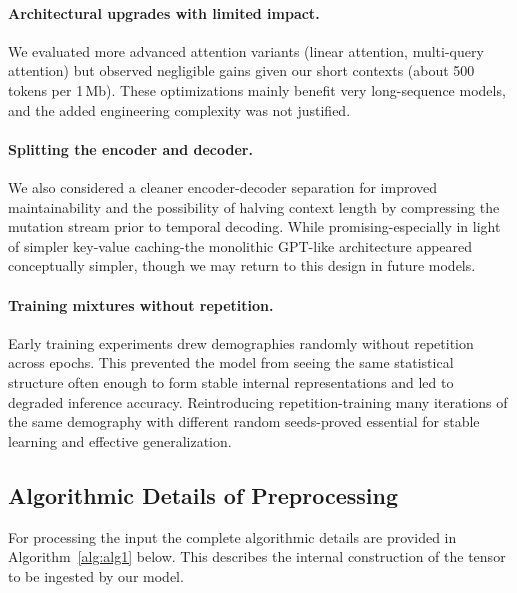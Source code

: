 \documentclass[9pt,twoside]{pnas-new} %
\providecommand{\DIFadd}[1]{{\protect\color{blue}\uwave{#1}}} %
\providecommand{\DIFaddbegin}{} %
\providecommand{\DIFaddend}{} %
\begin{document}
\paragraph{Architectural upgrades with limited impact.}
We evaluated more advanced attention variants (linear
attention, multi-query attention) but observed negligible gains given our short
contexts (about 500 tokens per 1\,Mb). These optimizations mainly benefit
very long-sequence models, and the added engineering complexity was not
justified.

\paragraph{Splitting the encoder and decoder.}
We also considered a cleaner encoder-decoder separation for improved
maintainability and the possibility of halving context length by compressing
the mutation stream prior to temporal decoding. While promising-\DIFaddbegin \DIFadd{--}\DIFaddend especially in
light of simpler key-value caching-\DIFaddbegin \DIFadd{--}\DIFaddend the monolithic GPT-like architecture appeared conceptually simpler, though we may return to this design in future models.

\paragraph{Training mixtures without repetition.}
Early training experiments drew demographies randomly without repetition across
epochs. This prevented the model from seeing the same statistical structure
often enough to form stable internal representations and led to degraded
inference accuracy. Reintroducing repetition-\DIFaddbegin \DIFadd{--}\DIFaddend training many iterations of the
same demography with different random seeds-\DIFaddbegin \DIFadd{--}\DIFaddend proved essential for stable
learning and effective generalization.


\subsection*{Algorithmic Details of Preprocessing}
For processing the input the complete algorithmic details are  provided in Algorithm~\ref{alg:alg1} below.
This describes the internal construction of the tensor to be ingested by our model.
\end{document}

